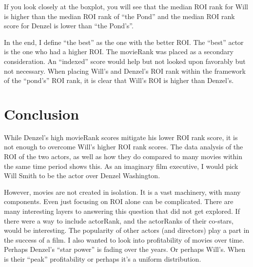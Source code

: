 \documentclass[]{article}
\begin{document}
\label{fig:Boxplot}

If you look closely at the boxplot, you will see that the median ROI
rank for Will is higher than the median ROI rank of \enquote{the Pond}
and the median ROI rank score for Denzel is lower than \enquote{the
Pond's}.

In the end, I define \enquote{the best} as the one with the better ROI.
The \enquote{best} actor is the one who had a higher ROI. The movieRank
was placed as a secondary consideration. An \enquote{indexed} score
would help but not looked upon favorably but not necessary. When placing
Will's and Denzel's ROI rank within the framework of the
\enquote{pond's} ROI rank, it is clear that Will's ROI is higher than
Denzel's.

\section{Conclusion}
\label{sec:conclusion}

While Denzel's high movieRank scores mitigate his lower ROI rank score,
it is not enough to overcome Will's higher ROI rank scores. The data
analysis of the ROI of the two actors, as well as how they do compared
to many movies within the same time period shows this. As an imaginary
film executive, I would pick Will Smith to be the actor over Denzel
Washington.

However, movies are not created in isolation. It is a vast machinery,
with many components. Even just focusing on ROI alone can be
complicated. There are many interesting layers to answering this
question that did not get explored. If there were a way to include
actorRank, and the actorRanks of their co-stars, would be interesting.
The popularity of other actors (and directors) play a part in the
success of a film. I also wanted to look into profitability of movies
over time. Perhaps Denzel's \enquote{star power} is fading over the
years. Or perhaps Will's. When is their \enquote{peak} profitability or
perhaps it's a uniform distribution.






\newpage
\theendnotes

\newpage
\begin{auxmulticols}{1}
\singlespacing 


\end{auxmulticols}

\newpage
{
\hypersetup{linkcolor=black}
\setcounter{tocdepth}{3}
\tableofcontents
}
\end{document}
